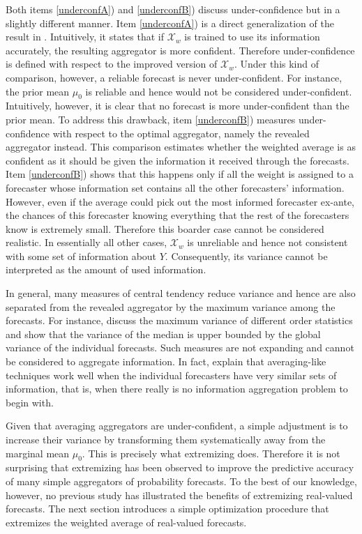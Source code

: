 \documentclass[11pt]{article}
\theoremstyle{definition}
\theoremstyle{definition}
\begin{document}
Both items \ref{underconfA}) and \ref{underconfB}) discuss under-confidence but in a slightly different manner. Item \ref{underconfA}) is a direct generalization of the result in \cite{Ranjan08}. Intuitively, it states that if $\mathcal{X}_w$ is trained to use its information accurately, the resulting aggregator is more confident. Therefore under-confidence is defined with respect to the improved version of  $\mathcal{X}_w$. Under this kind of comparison, however, a reliable forecast is never under-confident. For instance, 
the prior mean $\mu_0$ is reliable and hence would not be considered under-confident. Intuitively, however, it is clear that no forecast is more under-confident than the prior mean. To address this drawback, item \ref{underconfB}) measures under-confidence with respect to the optimal aggregator, namely the revealed aggregator instead. This comparison estimates whether the weighted average is as confident as it should be given the information it received through the forecasts. Item \ref{underconfB}) shows that this happens only if all the weight is assigned to a forecaster whose information set contains all the other forecasters' information. However, even if the average could pick out the most informed forecaster ex-ante, the chances of this forecaster knowing everything that the rest of the forecasters know is extremely small. Therefore this boarder case cannot be considered realistic. In essentially all other cases, $\mathcal{X}_w$ is unreliable 
and hence not consistent with some set of information about $Y$. Consequently, its variance cannot be interpreted as the amount of used information. 

In general, many measures of central tendency reduce variance and hence are also separated from the revealed aggregator by the maximum variance among the forecasts. For instance, \cite{papadatos1995maximum} discuss the maximum variance of different order statistics and show that the variance of the median is upper bounded by the global variance of the individual forecasts. Such measures are not expanding and cannot be considered to aggregate information. In fact, \cite{satopaamodeling} explain that averaging-like techniques work well when the individual forecasters have very similar sets of information, that is, when there really is no information aggregation problem to begin with. 

Given that averaging aggregators are under-confident, a simple adjustment is to  increase their variance by transforming them systematically away from the marginal mean $\mu_0$. This is precisely what extremizing does. Therefore it is not surprising that extremizing has been observed to improve the predictive accuracy of many simple aggregators of  probability forecasts. To the best of our knowledge, however,  no previous study has illustrated the benefits of extremizing real-valued forecasts. The next section introduces a simple optimization procedure that extremizes the weighted average of real-valued forecasts. 
\end{document}
